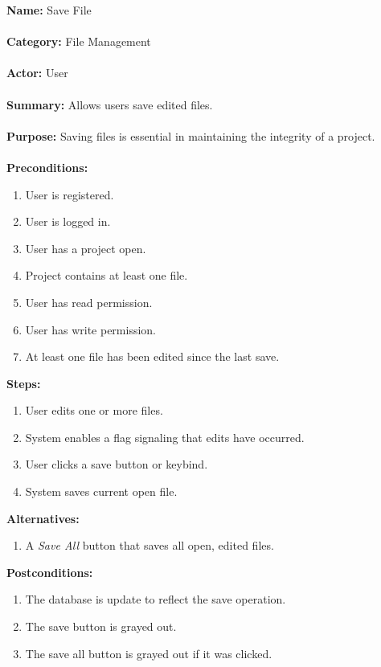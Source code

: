 \documentclass[14pt, a4paper]{article}
\begin{document}
\begin{framed}
	\noindent\textbf{Name:} Save File \\ \\
	\textbf{Category:} File Management \\ \\
	\textbf{Actor:} User \\ \\
	\textbf{Summary:} Allows users save edited files. \\ \\
	\textbf{Purpose:} Saving files is essential in maintaining the integrity of a project. \\ \\
	\textbf{Preconditions:} 
	\begin{enumerate}
		\item User is registered.
		\item User is logged in.
		\item User has a project open.
		\item Project contains at least one file.
		\item User has read permission.
		\item User has write permission.
		\item At least one file has been edited since the last save.
	\end{enumerate}		
	\textbf{Steps:}
	\begin{enumerate}
		\item User edits one or more files.
		\item System enables a flag signaling that edits have occurred.
		\item User clicks a save button or keybind.
		\item System saves current open file.
	\end{enumerate}	
	\textbf{Alternatives:} 
	\begin{enumerate}
		\item A \textit{Save All} button that saves all open, edited files.
	\end{enumerate}
	\textbf{Postconditions:}
	\begin{enumerate}
		\item The database is update to reflect the save operation.
		\item The save button is grayed out.
		\item The save all button is grayed out if it was clicked.
	\end{enumerate}
\end{framed}
\end{document}
